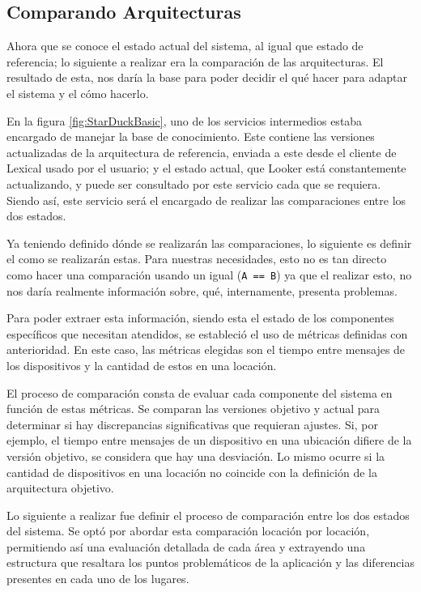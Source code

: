 
\subsection{Comparando Arquitecturas}

Ahora que se conoce el estado actual del sistema, al igual que estado de referencia; lo siguiente a realizar era la comparación de las arquitecturas. El resultado de esta, nos daría la base para poder decidir el qué hacer para adaptar el sistema y el cómo hacerlo.

En la figura \ref{fig:StarDuckBasic}, uno de los servicios intermedios estaba encargado de manejar la base de conocimiento. Este contiene las versiones actualizadas de la arquitectura de referencia, enviada a este desde el cliente de Lexical usado por el usuario; y el estado actual, que Looker está constantemente actualizando, y puede ser consultado por este servicio cada que se requiera. Siendo así, este servicio será el encargado de realizar las comparaciones entre los dos estados.

Ya teniendo definido dónde se realizarán las comparaciones, lo siguiente es definir el como se realizarán estas. Para nuestras necesidades, esto no es tan directo como hacer una comparación usando un igual (\texttt{A == B}) ya que el realizar esto, no nos daría realmente información sobre, qué, internamente, presenta problemas.

Para poder extraer esta información, siendo esta el estado de los componentes específicos que necesitan atendidos, se estableció el uso de métricas definidas con anterioridad. En este caso, las métricas elegidas son el tiempo entre mensajes de los dispositivos y la cantidad de estos en una locación.

El proceso de comparación consta de evaluar cada componente del sistema en función de estas métricas. Se comparan las versiones objetivo y actual para determinar si hay discrepancias significativas que requieran ajustes. Si, por ejemplo, el tiempo entre mensajes de un dispositivo en una ubicación difiere de la versión objetivo, se considera que hay una desviación. Lo mismo ocurre si la cantidad de dispositivos en una locación no coincide con la definición de la arquitectura objetivo.

Lo siguiente a realizar fue definir el proceso de comparación entre los dos estados del sistema. Se optó por abordar esta comparación locación por locación, permitiendo así una evaluación detallada de cada área y extrayendo una estructura que resaltara los puntos problemáticos de la aplicación y las diferencias presentes en cada uno de los lugares. 

